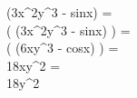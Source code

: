  (3x^2y^3 - sinx) =\\
 \left( (3x^2y^3 - sinx) \right) =\\
 \left( (6xy^3 - cosx) \right) =\\
 18xy^2 =\\
18y^2